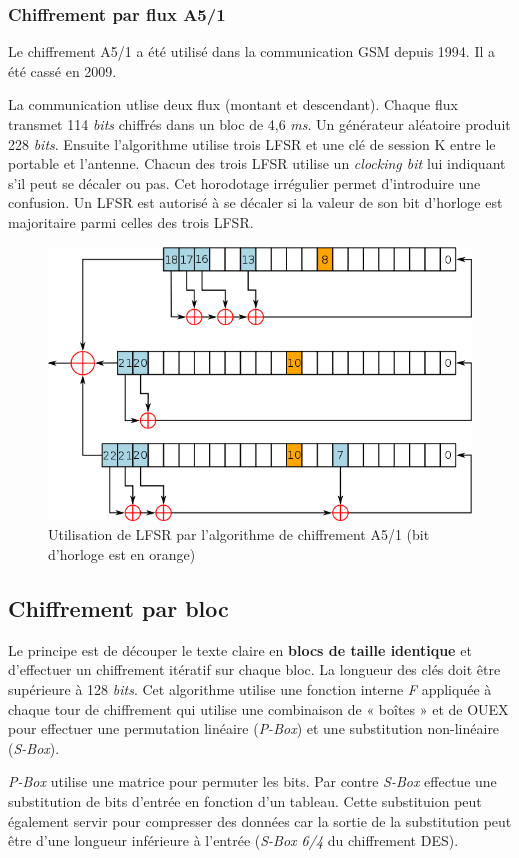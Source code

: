 \documentclass[12pt, a4paper]{article}
\begin{document}
	\subsubsection{Chiffrement par flux A5/1}
	Le chiffrement A5/1 a été utilisé dans la communication GSM depuis 1994. Il a été cassé en 2009.
	\par
	La communication utlise deux flux (montant et descendant). Chaque flux transmet 114 \textit{bits} chiffrés dans un bloc de 4,6 \textit{ms}. Un générateur aléatoire produit 228 \textit{bits}. Ensuite l'algorithme utilise trois LFSR et une clé de session K entre le portable et l'antenne. Chacun des trois LFSR utilise un \textit{clocking bit} lui indiquant s'il peut se décaler ou pas. Cet horodotage irrégulier permet d'introduire une confusion. Un LFSR est autorisé à se décaler si la valeur de son bit d'horloge est majoritaire parmi celles des trois LFSR.
	\begin{figure}[!ht]
		\centering
		\includegraphics[width=1\textwidth]{images/Lfsra51}
		\caption{Utilisation de LFSR par l'algorithme de chiffrement A5/1 (bit d'horloge est en orange)}
		\label{fig:lfsra51}
	\end{figure}
	\subsection{Chiffrement par bloc}
	Le principe est de découper le texte claire en \textbf{blocs de taille identique} et d'effectuer un chiffrement itératif sur chaque bloc. La longueur des clés doit être supérieure à 128 \textit{bits}. Cet algorithme utilise une fonction interne \textit{F} appliquée à chaque tour de chiffrement qui utilise une combinaison de « boîtes » et de OUEX pour effectuer une permutation linéaire (\textit{P-Box}) et une substitution non-linéaire (\textit{S-Box}).
	\par
	\textit{P-Box} utilise une matrice pour permuter les bits. Par contre \textit{S-Box} effectue une substitution de bits d'entrée en fonction d'un tableau. Cette substituion peut également servir pour compresser des données car la sortie de la substitution peut être d'une longueur inférieure à l'entrée (\textit{S-Box 6/4} du chiffrement DES).
\end{document}
